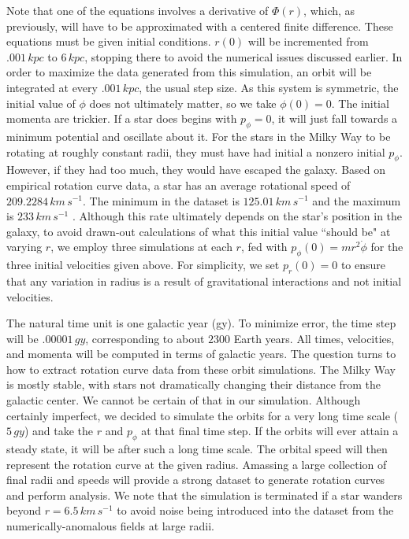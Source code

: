 \documentclass[11pt, twocolumn]{article}
\begin{document}
    Note that one of the equations involves a derivative of $\Phi (r)$, which, as previously, will have to be approximated with a centered finite difference. These equations must be given initial conditions. $r(0)$ will be incremented from $.001 \, \si{kpc}$ to $6 \, \si{kpc}$, stopping there to avoid the numerical issues discussed earlier. In order to maximize the data generated from this simulation, an orbit will be integrated at every $.001 \, \si{kpc}$, the usual step size. As this system is symmetric, the initial value of $\phi$ does not ultimately matter, so we take $\phi(0) = 0$. The initial momenta are trickier. If a star does begins with $p_\phi = 0$, it will just fall towards a minimum potential and oscillate about it. For the stars in the Milky Way to be rotating at roughly constant radii, they must have had initial a nonzero initial  $p_\phi$. However, if they had too much, they would have escaped the galaxy. Based on empirical rotation curve data, a star has an average rotational speed of $209.2284 \, \si{km \, s^{-1}}$. The minimum in the dataset is $125.01 \, \si{km \, s^{-1}}$ and the maximum is $233 \, \si{km \, s^{-1}}$ \parencite{bhattacharjee_rotation_2014}. Although this rate ultimately depends on the star's position in the galaxy, to avoid drawn-out calculations of what this initial value ``should be" at varying $r$, we employ three simulations at each $r$, fed with $p_\phi(0) = mr^2\dot{\phi}$ for the three initial velocities given above. For simplicity, we set $p_r(0) = 0$ to ensure that any variation in radius is a result of gravitational interactions and not initial velocities.

    The natural time unit is one galactic year (gy). To minimize error, the time step will be $.00001 \, \si{gy}$, corresponding to about $2300$ Earth years. All times, velocities, and momenta will be computed in terms of galactic years. The question turns to how to extract rotation curve data from these orbit simulations. The Milky Way is mostly stable, with stars not dramatically changing their distance from the galactic center. We cannot be certain of that in our simulation. Although certainly imperfect, we decided to simulate the orbits for a very long time scale ($5 \, \si{gy}$) and take the $r$ and $p_\phi$ at that final time step. If the orbits will ever attain a steady state, it will be after such a long time scale. The orbital speed will then represent the rotation curve at the given radius. Amassing a large collection of final radii and speeds will provide a strong dataset to generate rotation curves and perform analysis. We note that the simulation is terminated if a star wanders beyond $r = 6.5 \, \si{km \, s^{-1}}$ to avoid noise being introduced into the dataset from the numerically-anomalous fields at large radii.
    
\end{document}
